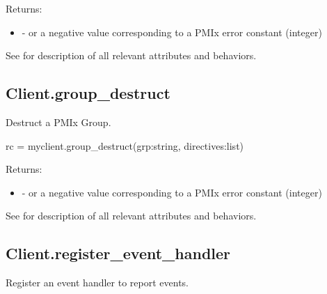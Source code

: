 Returns:

\begin{itemize}
    \item {} -  or a negative value corresponding to a PMIx error constant (integer)
\end{itemize}

See  for description of all relevant attributes and behaviors.


\subsection{Client.group_destruct}

\summary

Destruct a PMIx Group.

\format

\pyspecificstart
\begin{codepar}
rc = myclient.group_destruct(grp:string, directives:list)
\end{codepar}
\pyspecificend

\begin{arglist}
\end{arglist}

Returns:

\begin{itemize}
    \item {} -  or a negative value corresponding to a PMIx error constant (integer)
\end{itemize}

See  for description of all relevant attributes and behaviors.


\subsection{Client.register_event_handler}

\summary

Register an event handler to report events.

\format

